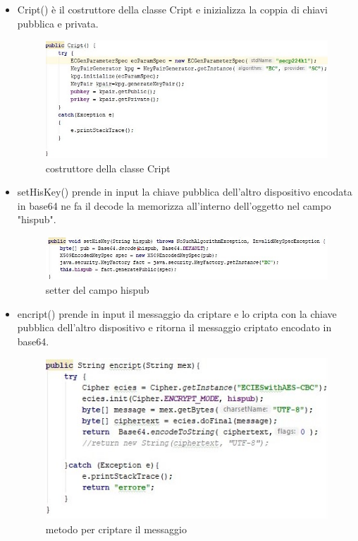 \begin{itemize}
   \item Cript() è il costruttore della classe Cript e
   inizializza la coppia di chiavi pubblica e privata.
   \begin{figure}
       \caption{costruttore della classe Cript}
       \includegraphics[width=1\columnwidth]{imgs/Criptconstructor.jpg}
   \end{figure}

   \item setHisKey() prende in input la chiave pubblica dell'altro dispositivo
   encodata in base64 ne fa il decode la memorizza all'interno dell'oggetto
   nel campo "hispub".
   \begin{figure}
       \caption{setter del campo hispub}
       \includegraphics[width=1  \columnwidth]{imgs/sethiskey.jpg}
   \end{figure}



   \item encript() prende in input il messaggio da criptare e lo cripta con la
   chiave pubblica dell'altro dispositivo e ritorna il messaggio criptato
   encodato in base64.
   \begin{figure}
       \caption{metodo per criptare il messaggio}
       \includegraphics[width=0.8  \columnwidth]{imgs/encript.jpg}
   \end{figure}


\end{itemize}
